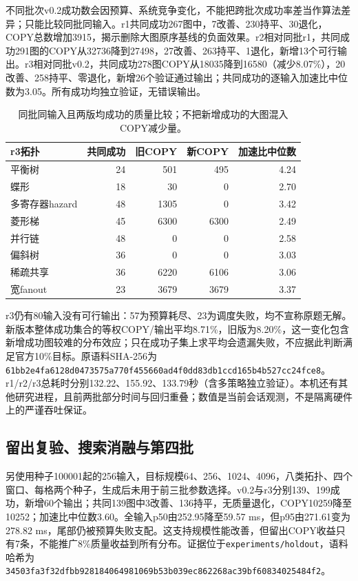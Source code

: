 \documentclass[UTF8,11pt,fontset=fandol]{ctexart}
\begin{document}
不同批次v0.2成功数会因预算、系统竞争变化，不能把跨批次成功率差当作算法差异；只能比较同批同输入。r1共同成功267图中，7改善、230持平、30退化，COPY总数增加3915，揭示删除大图原序基线的负面效果。r2相对同批r1，共同成功291图的COPY从32736降到27498，27改善、263持平、1退化，新增13个可行输出。r3相对同批v0.2，共同成功278图COPY从18035降到16580（减少8.07\%），20改善、258持平、零退化，新增26个验证通过输出；共同成功的逐输入加速比中位数为3.05。所有成功均独立验证，无错误输出。

\begin{table}[htbp]\centering\small
\begin{tabular}{lrrrr}\toprule
r3拓扑 & 共同成功 & 旧COPY & 新COPY & 加速比中位数\\\midrule
平衡树 &24&501&495&4.24\\
蝶形 &18&30&0&2.70\\
多寄存器hazard &48&1305&0&3.42\\
菱形梯 &45&6300&6300&2.49\\
并行链 &48&0&0&2.58\\
偏斜树 &36&0&0&3.03\\
稀疏共享 &36&6220&6106&3.06\\
宽fanout &23&3679&3679&3.37\\\bottomrule
\end{tabular}\caption{同批同输入且两版均成功的质量比较；不把新增成功的大图混入COPY减少量。}\end{table}

r3仍有80输入没有可行输出：57为预算耗尽、23为调度失败，均不宣称原题无解。新版本整体成功集合的等权COPY/输出平均8.71\%，旧版为8.20\%，这一变化包含新增成功图较难的分布效应；只在成功子集上求平均会遗漏失败，不应据此判断满足官方10\%目标。原语料SHA-256为\texttt{61bb2e4fa6128d0473575a770f455660ad4f0dd83db1ccd165b4b527cc24fce8}。r1/r2/r3总耗时分别132.22、155.92、133.79秒（含多策略独立验证）。本机还有其他研究进程，且前两批部分时间与回归重叠；数值是当前会话观测，不是隔离硬件上的严谨吞吐保证。

\subsection{留出复验、搜索消融与第四批}
另使用种子100001起的256输入，目标规模64、256、1024、4096，八类拓扑、四个窗口、每格两个种子，生成后未用于前三批参数选择。v0.2与r3分别139、199成功，新增60个输出；共同139图中3改善、136持平，无质量退化，COPY10259降至10252；加速比中位数3.60。全输入p50由252.95降至59.57 ms，但p95由271.61变为278.82 ms，尾部仍被预算失败支配。这支持规模性能改善，但留出COPY收益只有7条，不能推广8\%质量收益到所有分布。证据位于\texttt{experiments/holdout}，语料哈希为\texttt{34503fa3f32dfbb928184064981069b53b039ec862268ac39bf60834025484f2}。
\end{document}

